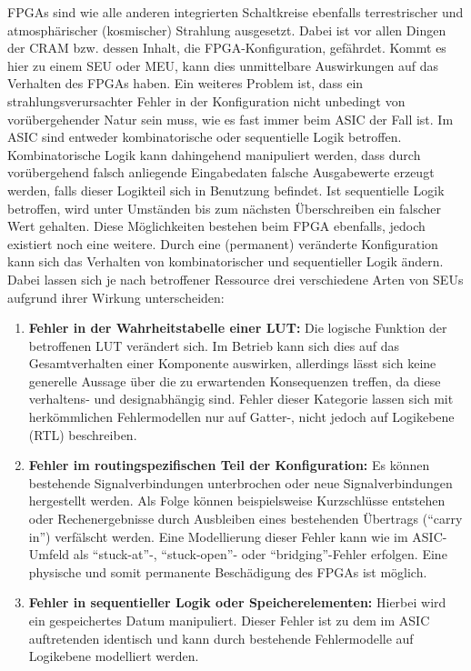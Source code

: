 FPGAs sind wie alle anderen integrierten Schaltkreise ebenfalls
terrestrischer und atmosphärischer (kosmischer) Strahlung
ausgesetzt. Dabei ist vor allen Dingen der CRAM bzw. dessen Inhalt,
die FPGA-Konfiguration, gefährdet. Kommt es hier zu einem SEU oder
MEU, kann dies unmittelbare Auswirkungen auf das Verhalten des FPGAs
haben. Ein weiteres Problem ist, dass ein strahlungsverursachter
Fehler in der Konfiguration nicht unbedingt von vorübergehender Natur
sein muss, wie es fast immer beim ASIC der Fall ist. Im ASIC sind
entweder kombinatorische oder sequentielle Logik
betroffen. Kombinatorische Logik kann dahingehend manipuliert werden,
dass durch vorübergehend falsch anliegende Eingabedaten falsche
Ausgabewerte erzeugt werden, falls dieser Logikteil sich in Benutzung
befindet. Ist
sequentielle Logik betroffen, wird unter Umständen bis zum nächsten
Überschreiben ein falscher Wert gehalten. Diese Möglichkeiten bestehen
beim FPGA ebenfalls, jedoch existiert noch eine weitere. Durch eine
(permanent) veränderte Konfiguration kann sich das Verhalten von
kombinatorischer und sequentieller Logik ändern. Dabei lassen sich je
nach betroffener Ressource drei verschiedene Arten von SEUs aufgrund
ihrer Wirkung unterscheiden:

\begin{enumerate}
\item \textbf{Fehler in der Wahrheitstabelle einer LUT:} Die logische
  Funktion der betroffenen LUT verändert sich. Im Betrieb kann sich
  dies auf das Gesamtverhalten einer Komponente auswirken, allerdings
  lässt sich keine generelle Aussage über die zu erwartenden
  Konsequenzen treffen, da diese verhaltens- und designabhängig
  sind. Fehler dieser Kategorie lassen sich mit herkömmlichen
  Fehlermodellen nur auf Gatter-, nicht jedoch auf Logikebene (RTL)
  beschreiben.
\item \textbf{Fehler im routingspezifischen Teil der Konfiguration:}
  Es können bestehende Signalverbindungen unterbrochen oder neue
  Signalverbindungen hergestellt werden. Als Folge können
  beispielsweise Kurzschlüsse entstehen oder Rechenergebnisse durch
  Ausbleiben eines bestehenden Übertrags (``carry in'') verfälscht
  werden. Eine Modellierung dieser Fehler kann wie im ASIC-Umfeld als
  ``stuck-at''-, ``stuck-open''- oder ``bridging''-Fehler
  erfolgen. Eine physische und somit permanente Beschädigung des FPGAs
  ist möglich.
\item \textbf{Fehler in sequentieller Logik oder Speicherelementen:}
  Hierbei wird ein gespeichertes Datum manipuliert. Dieser Fehler
  ist zu dem im ASIC auftretenden identisch und kann durch bestehende
  Fehlermodelle auf Logikebene modelliert werden. 
\end{enumerate}

